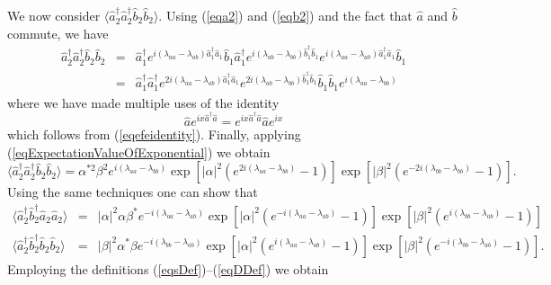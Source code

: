 \documentclass{iopart}
\begin{document}
We now consider $\langle \hat{a}^{\dagger}_2 \hat{a}^{\dagger}_2 \hat{b}_2 \hat{b}_2 \rangle$. Using (\ref{eqa2}) and (\ref{eqb2}) and the fact that $\hat{a}$ and $\hat{b}$ commute, we have
\begin{eqnarray}
\hat{a}^{\dagger}_2 \hat{a}^{\dagger}_2 \hat{b}_2 \hat{b}_2 &=& \hat{a}^{\dagger}_1 
  e^{i (\lambda_{aa}-\lambda_{ab}) \hat{a}^{\dagger}_1 \hat{a}_1}
  \hat{b}_1 \hat{a}^{\dagger}_1
  e^{i (\lambda_{ab}-\lambda_{bb}) \hat{b}^{\dagger}_1 \hat{b}_1}
  e^{i (\lambda_{aa}-\lambda_{ab}) \hat{a}^{\dagger}_1 \hat{a}_1}
  \hat{b}_1 \\
%
&=& \hat{a}^{\dagger}_1 \hat{a}^{\dagger}_1 
    e^{2i (\lambda_{aa}-\lambda_{ab}) \hat{a}^{\dagger}_1 \hat{a}_1}
    e^{2i (\lambda_{ab}-\lambda_{bb}) \hat{b}^{\dagger}_1 \hat{b}_1}
    \hat{b}_1 \hat{b}_1 e^{i(\lambda_{aa}-\lambda_{bb})}
\end{eqnarray}
where we have made multiple uses of the identity 
\begin{equation}
\hat{a} e^{i x \hat{a}^{\dagger} \hat{a}} = e^{i x \hat{a}^{\dagger} \hat{a}} \hat{a} e^{ix}
\end{equation}
which follows from (\ref{eqefeidentity}). Finally, applying (\ref{eqExpectationValueOfExponential}) we obtain
\begin{equation}
\langle \hat{a}^{\dagger}_2 \hat{a}^{\dagger}_2 \hat{b}_2 \hat{b}_2 \rangle = \alpha^{*2} \beta^2 e^{i(\lambda_{aa}-\lambda_{bb})} \exp[|\alpha|^2(e^{2i (\lambda_{aa} - \lambda_{bb})} -1)] \exp[|\beta|^2(e^{-2i (\lambda_{bb} - \lambda_{bb})} -1)].
\end{equation}
Using the same techniques one can show that
\begin{eqnarray}
\langle \hat{a}^{\dagger}_2 \hat{b}^{\dagger}_2 \hat{a}_2 \hat{a}_2 \rangle &=& |\alpha|^2 \alpha \beta^* e^{-i(\lambda_{aa}-\lambda_{ab})} \exp[|\alpha|^2(e^{-i (\lambda_{aa} - \lambda_{ab})} -1)] \exp[|\beta|^2(e^{i (\lambda_{bb} - \lambda_{ab})} -1)] \\
%
\langle \hat{a}^{\dagger}_2 \hat{b}^{\dagger}_2 \hat{b}_2 \hat{b}_2 \rangle &=& |\beta|^2 \alpha^{*} \beta e^{-i(\lambda_{bb}-\lambda_{ab})} \exp[|\alpha|^2(e^{i (\lambda_{aa} - \lambda_{ab})} -1)] \exp[|\beta|^2(e^{-i (\lambda_{bb} - \lambda_{ab})} -1)].
\end{eqnarray}
Employing the definitions (\ref{eqsDef})--(\ref{eqDDef}) we obtain
\end{document}
